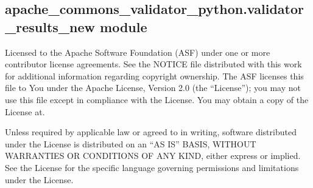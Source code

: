 \documentclass[letterpaper,10pt,english]{sphinxmanual}
\begin{document}
\begin{fulllineitems}
\begin{fulllineitems}
\begin{quote}
\begin{description}
\end{description}\end{quote}

\end{fulllineitems}


\begin{fulllineitems}
\label{\detokenize{apache_commons_validator_python:apache_commons_validator_python.validator_result_new.ValidatorResult.serializable}}
\pysigstartsignatures
{}
\pysigstopsignatures
\end{fulllineitems}


\end{fulllineitems}



\subsection{apache\_commons\_validator\_python.validator\_results\_new module}
\label{\detokenize{apache_commons_validator_python:module-apache_commons_validator_python.validator_results_new}}\label{\detokenize{apache_commons_validator_python:apache-commons-validator-python-validator-results-new-module}}
\sphinxAtStartPar
Licensed to the Apache Software Foundation (ASF) under one or more contributor
license agreements.  See the NOTICE file distributed with this work for additional
information regarding copyright ownership. The ASF licenses this file to You under the
Apache License, Version 2.0 (the “License”); you may not use this file except in
compliance with the License.  You may obtain a copy of the License at.

\sphinxAtStartPar
{}

\sphinxAtStartPar
Unless required by applicable law or agreed to in writing, software
distributed under the License is distributed on an “AS IS” BASIS,
WITHOUT WARRANTIES OR CONDITIONS OF ANY KIND, either express or implied.
See the License for the specific language governing permissions and
limitations under the License.
\end{document}
